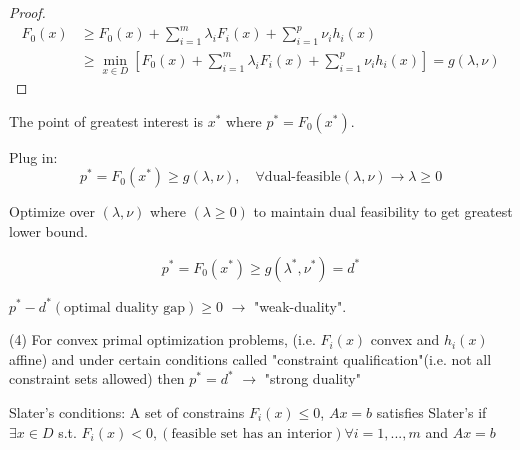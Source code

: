 \begin{proof}
	\begin{align*}
	F_0(x) &\geq F_0(x) + \sum^m_{i=1}\lambda_iF_i(x) + \sum^p_{i=1}\nu_ih_i(x)\\
	&\geq \min_{x\in D} [F_0(x) + \sum^m_{i=1}\lambda_iF_i(x) + \sum^p_{i=1}\nu_ih_i(x) ] = g(\lambda, \nu)
	\end{align*}
\end{proof}

The point of greatest interest is $x^*$ where $p^* = F_0(x^*)$.

Plug in: 
\begin{equation*}
p^* = F_0(x^*) \geq g(\lambda, \nu), \quad \forall \text{dual-feasible} (\lambda, \nu)\rightarrow \lambda \geq 0
\end{equation*}

Optimize over $(\lambda, \nu)$ where $(\lambda \geq 0)$ to maintain dual feasibility to get greatest lower bound. 

\begin{equation*}
p^* = F_0(x^*) \geq g(\lambda^*, \nu^*) = d^*
\end{equation*}

$p^* - d^*(\text{optimal duality gap})\geq 0$ $\rightarrow$ "weak-duality".

(4) For convex primal optimization problems, (i.e. $F_i(x)$ convex and $h_i(x)$ affine) and under certain conditions called "constraint qualification"(i.e. not all constraint sets allowed) then $p^* = d^*$ $\rightarrow$ "strong duality"

Slater's conditions: A set of constrains $F_i(x) \leq 0$, $Ax = b$ satisfies Slater's if $\exists x\in D$ s.t. $F_i(x)<0,(\text{feasible set has an interior}) \forall i = 1,...,m$ and $Ax = b$



